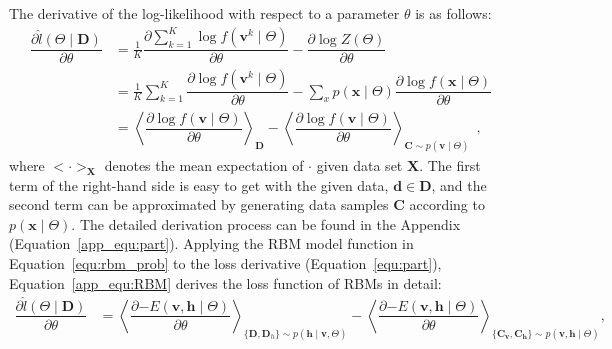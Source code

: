 The derivative of the log-likelihood with respect to a parameter $\theta$ is as follows:
\begin{equation}
\label{equ:part}
\begin{aligned}
\dfrac{\partial \hat{l} (\Theta \mid \mathbf{D})}{\partial \theta} 
& = \frac{1}{K} \dfrac{\partial \sum_{k=1}^K\log f(\mathbf{v}^k \mid \Theta )}{\partial \theta} - \dfrac{\partial \log Z( \Theta)}{\partial \theta}\\
& =  \frac{1}{K}\sum_{k=1}^K \dfrac{\partial \log f(\mathbf{v}^k \mid \Theta)}{\partial \theta} - \sum_x p(\mathbf{x} \mid \Theta) \dfrac{\partial \log f(\mathbf{x} \mid \Theta)}{\partial \theta}\\
& = \left \langle \dfrac{\partial \log f(\mathbf{v} \mid \Theta)}{\partial \theta}\right \rangle_{\mathbf{D}} -\left \langle \dfrac{\partial \log f(\mathbf{v} \mid \Theta)}{\partial \theta}\right \rangle_{\mathbf{C} \sim p(\mathbf{v} \mid \Theta)} ~~,
\end{aligned}
\end{equation}
where  $ <\cdot>_{\mathbf{X}} $ denotes the mean expectation of $ \cdot $ given data set $\mathbf{X}$.
The first term of the right-hand side is easy to get with the given data, $\mathbf{d} \in \mathbf{D} $, and the second term can be approximated by generating data samples $\mathbf{C} $ according to $ p(\mathbf{x} \mid \Theta) $.
The detailed derivation process can be found in the Appendix (Equation~\ref{app_equ:part}).
Applying the RBM model function in Equation~\ref{equ:rbm_prob} to the loss derivative (Equation~\ref{equ:part}), Equation~\ref{app_equ:RBM} derives the loss function of RBMs in detail:
\begin{equation}
\label{equ:RBM}
\begin{aligned}
\dfrac{\partial \hat{l} (\Theta \mid \mathbf{D})}{\partial \theta} 
& = \left \langle \dfrac{\partial {-E}(\mathbf{v}, \mathbf{h} \mid \Theta)}{\partial \theta} \right \rangle_{\{\mathbf{D}, \mathbf{D}_h\} \sim p( \mathbf{h} \mid \mathbf{v}, \Theta)} 
- \left \langle \dfrac{\partial {-E}(\mathbf{v}, \mathbf{h} \mid \Theta)}{\partial \theta} \right \rangle_{\{\mathbf{C_v}, \mathbf{C_h}\} \sim p( \mathbf{v}, \mathbf{h} \mid  \Theta)},  \\
\end{aligned}
\end{equation}
